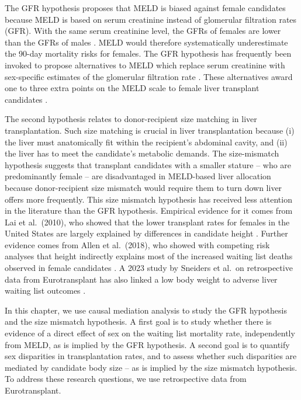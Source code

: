 \documentclass[11pt,twoside,]{book}
\begin{document}
The GFR hypothesis proposes that MELD is biased against female candidates because
MELD is based on serum creatinine instead of glomerular filtration rates (GFR).
With the same serum creatinine level, the GFRs of females are lower than the GFRs
of males \citep{cholongitasFemaleLiverTransplant2007}. MELD would therefore systematically
underestimate the 90-day mortality risks for females. The GFR hypothesis has
frequently been invoked to propose alternatives to MELD which replace serum
creatinine with sex-specific estimates
of the glomerular filtration rate \citep{rodriguezPeralvarezDevelopmentValidationGenderEquity2023, myersGenderRenalFunction2011, asraniMELDGRAILNaGlomerularFiltration2020}. These
alternatives award one to three extra points on the MELD scale to female
liver transplant candidates \citep{vernaTimeActionAddress2020, waltercostaRevisingMELDScore2023, cholongitasGenderDisparityMELD2011, allenReducedAccessLiver2018}.

The second hypothesis relates to donor-recipient size matching in liver transplantation.
Such size matching is crucial in liver transplantation because
(i) the liver must anatomically fit within the recipient's abdominal cavity,
and (ii) the liver has to meet the candidate's metabolic demands. The size-mismatch
hypothesis suggests that transplant candidates with a smaller stature
-- who are predominantly female -- are disadvantaged in MELD-based liver
allocation because donor-recipient size mismatch would require them to turn down
liver offers more frequently. This size mismatch hypothesis has received less
attention in the literature than the GFR hypothesis. Empirical evidence for
it comes from Lai et al.~(2010), who showed that the lower transplant rates
for females in the United States are largely
explained by differences in candidate height \citep{laiHeightContributesGender2010}.
Further evidence comes from Allen et al.~(2018), who showed with competing risk
analyses that height indirectly explains most of the increased waiting list
deaths observed in female candidates \citep{allenReducedAccessLiver2018}. A 2023
study by Sneiders et al.~on retrospective data from Eurotransplant has also linked
a low body weight to adverse liver waiting list outcomes \citep{Sneiders2023}.

In this chapter, we use causal mediation analysis to study the GFR hypothesis and the size mismatch hypothesis. A first
goal is to study whether there is evidence of a direct effect of sex on the
waiting list mortality rate, independently from MELD, as is implied by the
GFR hypothesis. A second goal is to quantify sex disparities in transplantation
rates, and to assess whether such disparities are mediated by
candidate body size -- as is implied by the size mismatch hypothesis. To address
these research questions, we use retrospective data from Eurotransplant.
\end{document}
